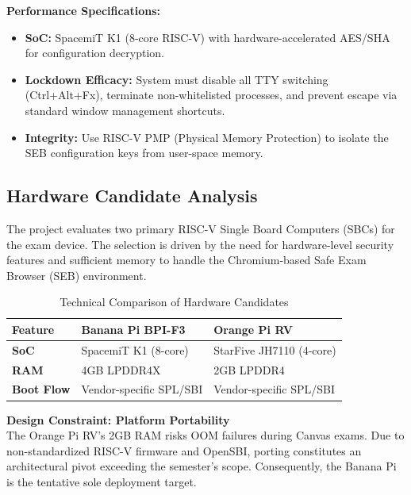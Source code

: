 \documentclass[11pt]{article}
\begin{document}
\textbf{Performance Specifications:}
\begin{itemize}
    \item \textbf{SoC:} SpacemiT K1 (8-core RISC-V) with hardware-accelerated AES/SHA for configuration decryption.
    \item \textbf{Lockdown Efficacy:} System must disable all TTY switching (Ctrl+Alt+Fx), terminate non-whitelisted processes, and prevent escape via standard window management shortcuts.
    \item \textbf{Integrity:} Use RISC-V PMP (Physical Memory Protection) to isolate the SEB configuration keys from user-space memory.
\end{itemize}

\subsection{Hardware Candidate Analysis}
The project evaluates two primary RISC-V Single Board Computers (SBCs) for the exam device. The selection is driven by the need for hardware-level security features and sufficient memory to handle the Chromium-based Safe Exam Browser (SEB) environment.

\begin{table}[h]
\centering
\caption{Technical Comparison of Hardware Candidates}
\label{tab:hw_comparison}
\begin{tabular}{|l|l|l|}
\hline
\textbf{Feature} & \textbf{Banana Pi BPI-F3} & \textbf{Orange Pi RV} \\ \hline
\textbf{SoC} & SpacemiT K1 (8-core) & StarFive JH7110 (4-core) \\ \hline
\textbf{RAM} & 4GB LPDDR4X & 2GB LPDDR4 \\ \hline
\textbf{Boot Flow} & Vendor-specific SPL/SBI & Vendor-specific SPL/SBI \\ \hline
\end{tabular}
\end{table}

\textbf{Design Constraint: Platform Portability} \\
The Orange Pi RV’s 2GB RAM risks OOM failures during Canvas exams. Due to non-standardized RISC-V firmware and OpenSBI, porting constitutes an architectural pivot exceeding the semester’s scope. Consequently, the Banana Pi is the tentative sole deployment target.
\end{document}
